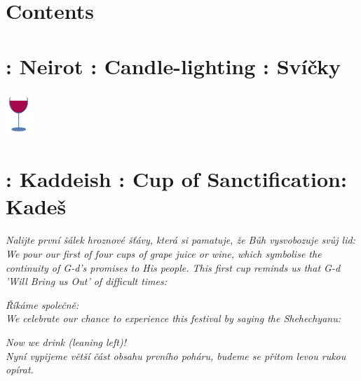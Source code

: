 \documentclass[a5paper,10pt]{memoir}
\begin{document}
\section{Contents}
\ContentsColumnar
%
\vspace*{-4ex}
\section{ : Neirot : Candle-lighting : Svíčky}

\Neirot
\vspace*{2ex}
\hfill\includegraphics[width=10mm]{cup}
\vspace*{-15ex}  %
		
\section{ : Kaddeish : Cup of Sanctification: Kadeš}
\begin{paracol}{2}
	{\textit{Nalijte první šálek hroznové šťávy, která si pamatuje, že Bůh vysvobozuje svůj lid:} \vspace*{2ex}\\
	\color{midblue}\textit{We pour our first of four cups of grape juice or wine, which symbolise the continuity of G-d's promises to His people. This first cup reminds us that G-d 'Will Bring us Out' of difficult times:}}
\end{paracol}
\Kaddeish
\textit{Říkáme společně:}
\\
\color{midblue}\textit{We celebrate our chance to experience this festival by saying the Shehechyanu:}
\color{black}
\Shehechyanu
\begin{center}
	\textit{\centering \color{midblue} Now we drink (leaning left)!} \\
	\textit{Nyní  vypijeme větší část obsahu prvního poháru, budeme se přitom levou rukou opírat.}
	\end{center}
\vspace*{2ex}
\end{document}
